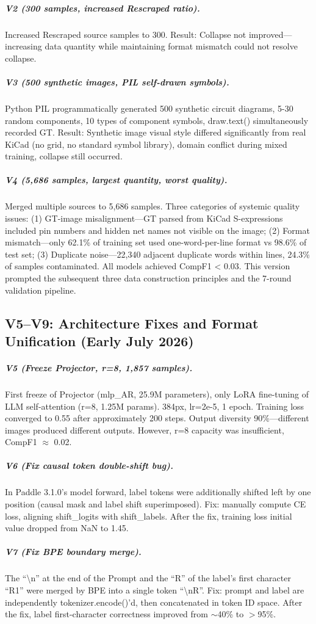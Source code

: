 \subparagraph{V2 (300 samples, increased Rescraped ratio).}
Increased Rescraped source samples to 300. Result: Collapse not improved---increasing data quantity while maintaining format mismatch could not resolve collapse.

\subparagraph{V3 (500 synthetic images, PIL self-drawn symbols).}
Python PIL programmatically generated 500 synthetic circuit diagrams, 5-30 random components, 10 types of component symbols, draw.text() simultaneously recorded GT. Result: Synthetic image visual style differed significantly from real KiCad (no grid, no standard symbol library), domain conflict during mixed training, collapse still occurred.

\subparagraph{V4 (5,686 samples, largest quantity, worst quality).}
Merged multiple sources to 5,686 samples. Three categories of systemic quality issues: (1) GT-image misalignment---GT parsed from KiCad S-expressions included pin numbers and hidden net names not visible on the image; (2) Format mismatch---only 62.1\% of training set used one-word-per-line format vs 98.6\% of test set; (3) Duplicate noise---22,340 adjacent duplicate words within lines, 24.3\% of samples contaminated. All models achieved CompF1 < 0.03. This version prompted the subsequent three data construction principles and the 7-round validation pipeline.

\subsection{V5--V9: Architecture Fixes and Format Unification (Early July 2026)}

\subparagraph{V5 (Freeze Projector, r=8, 1,857 samples).}
First freeze of Projector (mlp\_AR, 25.9M parameters), only LoRA fine-tuning of LLM self-attention (r=8, 1.25M params). 384px, lr=2e-5, 1 epoch. Training loss converged to 0.55 after approximately 200 steps. Output diversity 90\%---different images produced different outputs. However, r=8 capacity was insufficient, CompF1 $\approx$ 0.02.

\subparagraph{V6 (Fix causal token double-shift bug).}
In Paddle 3.1.0's model forward, label tokens were additionally shifted left by one position (causal mask and label shift superimposed). Fix: manually compute CE loss, aligning shift\_logits with shift\_labels. After the fix, training loss initial value dropped from NaN to 1.45.

\subparagraph{V7 (Fix BPE boundary merge).}
The ``\textbackslash n'' at the end of the Prompt and the ``R'' of the label's first character ``R1'' were merged by BPE into a single token ``\textbackslash nR''. Fix: prompt and label are independently tokenizer.encode()'d, then concatenated in token ID space. After the fix, label first-character correctness improved from $\sim$40\% to $>$95\%.

